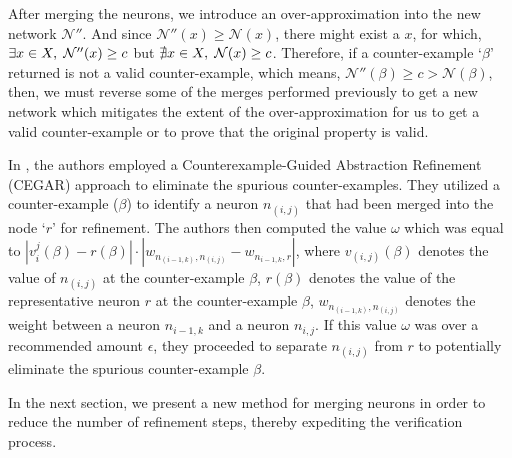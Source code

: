 
After merging the neurons, we introduce an over-approximation into 
the new network $\mathcal{N''}$. And since $\mathcal{N''}(x) \geq \mathcal{N}(x)$,
 there might exist a $x$, for which, $\exists x \in X, \hspace{1mm} \mathcal{N''}(x)
\geq c$ but $\nexists x \in X, \hspace{1mm} \mathcal{N}(x) \geq c$. 
Therefore, if a counter-example `$\beta$' returned is not a valid counter-example,
which means, $\mathcal{N''}(\beta) \geq c > \mathcal{N}(\beta)$, then, we must 
reverse some of the merges performed previously to get a new network which mitigates
the extent of the over-approximation for us to get a valid counter-example or to 
prove that the original property is valid.

In \cite{cegar-nn}, the authors employed a Counterexample-Guided Abstraction 
Refinement (CEGAR) approach to eliminate the spurious counter-examples. 
They utilized a counter-example ($\beta$) to identify a neuron $n_{(i, j)}$ 
that had been merged into the node `$r$' for refinement. The authors then 
computed the value $\omega$ which was equal to 
$|v_i^j(\beta) - r(\beta)| \cdot |w_{n_{(i-1, k)},n_{(i,j)}}-w_{n_{i-1,k},r}|$, 
where $v_{(i, j)}(\beta)$ denotes the value of $n_{(i, j)}$ at the 
counter-example $\beta$, $r(\beta)$ denotes the value of the 
representative neuron $r$ at the counter-example $\beta$, $w_{n_{(i-1,k)},n_{(i,j)}}$ 
denotes the weight between a neuron $n_{i-1,k}$ and a neuron $n_{i,j}$. 
If this value $\omega$ was over a recommended amount $\epsilon$, they proceeded to 
separate $n_{(i, j)}$ from $r$ to potentially eliminate the spurious counter-example 
$\beta$.



 In the next section, we present a new method for merging neurons in 
 order to reduce the number of refinement steps, thereby expediting the 
 verification process.
